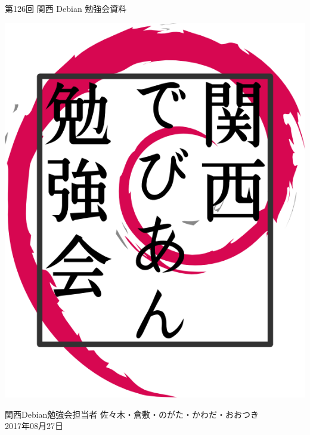 \documentclass[mingoth,a4paper]{jsarticle}
\newcommand{\debmtgyear}{2017}
\newcommand{\debmtgdate}{27}
\newcommand{\debmtgmonth}{08}
\newcommand{\debmtgnumber}{126}
\begin{document}
\begin{titlepage}


  第\debmtgnumber{}回 関西 Debian 勉強会資料

  \vspace{2cm}

  \begin{center}
    \includegraphics{image200802/kansaidebianlogo.png}
  \end{center}

  \begin{flushright}
    \hfill{}関西Debian勉強会担当者 佐々木・倉敷・のがた・かわだ・おおつき \\
    \hfill{}\debmtgyear{}年\debmtgmonth{}月\debmtgdate{}日
  \end{flushright}

  \thispagestyle{empty}
\end{titlepage}

\end{document}
